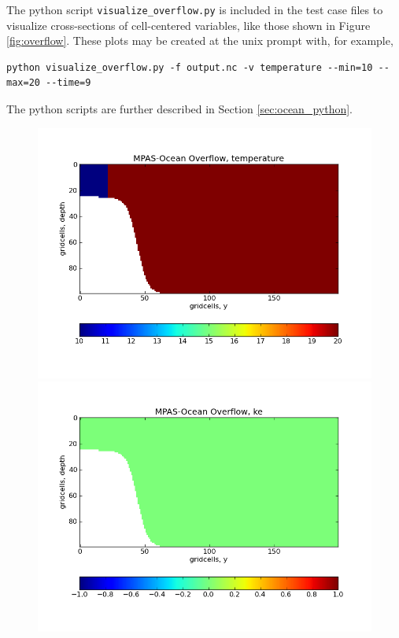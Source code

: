 The python script \verb|visualize_overflow.py| is included in the test case files to visualize cross-sections of cell-centered variables, like those shown in Figure \ref{fig:overflow}.  These plots may be created at the unix prompt with, for example,
\begin{verbatim}
python visualize_overflow.py -f output.nc -v temperature --min=10 --max=20 --time=9
\end{verbatim}
The python scripts are further described in Section \ref{sec:ocean_python}.

\begin{figure}[H!]
	\centering
	\includegraphics[scale=0.4]{ocean/figures/MPAS-O_overflow_temperature_0hrs.png}
	\includegraphics[scale=0.4]{ocean/figures/MPAS-O_overflow_ke_0hrs.png}\\

\end{figure}
